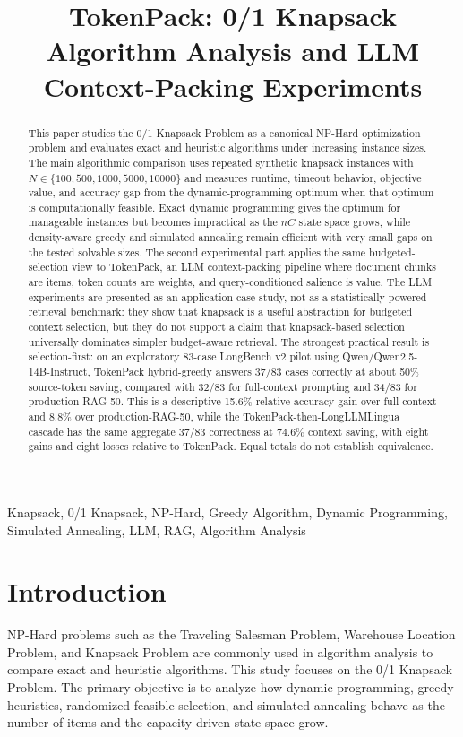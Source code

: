 \documentclass[conference]{IEEEtran}
\title{TokenPack: 0/1 Knapsack Algorithm Analysis and LLM Context-Packing Experiments}
\author{
\IEEEauthorblockN{Metehan Kizilcik}
\IEEEauthorblockA{
Department of Software Engineering\\
Manisa Celal Bayar University (CBU)\\
Email: 232803055@ogr.cbu.edu.tr, metekizilcik@gmail.com\\
Code: \url{https://github.com/mo-tunn/TokenPack}}
}
\begin{document}
\maketitle

\begin{abstract}
This paper studies the 0/1 Knapsack Problem as a canonical NP-Hard optimization problem and evaluates exact and heuristic algorithms under increasing instance sizes. The main algorithmic comparison uses repeated synthetic knapsack instances with $N \in \{100,500,1000,5000,10000\}$ and measures runtime, timeout behavior, objective value, and accuracy gap from the dynamic-programming optimum when that optimum is computationally feasible. Exact dynamic programming gives the optimum for manageable instances but becomes impractical as the $nC$ state space grows, while density-aware greedy and simulated annealing remain efficient with very small gaps on the tested solvable sizes. The second experimental part applies the same budgeted-selection view to TokenPack, an LLM context-packing pipeline where document chunks are items, token counts are weights, and query-conditioned salience is value. The LLM experiments are presented as an application case study, not as a statistically powered retrieval benchmark: they show that knapsack is a useful abstraction for budgeted context selection, but they do not support a claim that knapsack-based selection universally dominates simpler budget-aware retrieval. The strongest practical result is selection-first: on an exploratory 83-case LongBench v2 pilot using Qwen/Qwen2.5-14B-Instruct, TokenPack hybrid-greedy answers 37/83 cases correctly at about 50\% source-token saving, compared with 32/83 for full-context prompting and 34/83 for production-RAG-50. This is a descriptive 15.6\% relative accuracy gain over full context and 8.8\% over production-RAG-50, while the TokenPack-then-LongLLMLingua cascade has the same aggregate 37/83 correctness at 74.6\% context saving, with eight gains and eight losses relative to TokenPack. Equal totals do not establish equivalence.
\end{abstract}

\begin{IEEEkeywords}
Knapsack, 0/1 Knapsack, NP-Hard, Greedy Algorithm, Dynamic Programming, Simulated Annealing, LLM, RAG, Algorithm Analysis
\end{IEEEkeywords}

\section{Introduction}
NP-Hard problems such as the Traveling Salesman Problem, Warehouse Location Problem, and Knapsack Problem are commonly used in algorithm analysis to compare exact and heuristic algorithms. This study focuses on the 0/1 Knapsack Problem. The primary objective is to analyze how dynamic programming, greedy heuristics, randomized feasible selection, and simulated annealing behave as the number of items and the capacity-driven state space grow.
\end{document}
